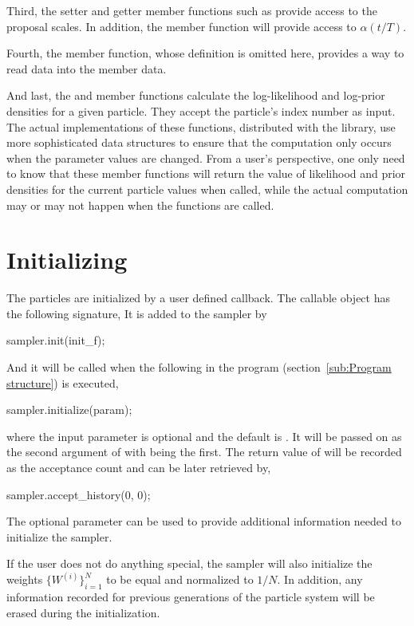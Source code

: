 Third, the setter and getter member functions such as 
provide access to the proposal scales. In addition, the member function
 will provide access to $\alpha(t/T)$.

Fourth, the  member function, whose definition is omitted
here, provides a way to read data into the  member data.

And last, the  and  member
functions calculate the log-likelihood and log-prior densities for a given
particle. They accept the particle's index number as input. The actual
implementations of these functions, distributed with the library, use more
sophisticated data structures to ensure that the computation only occurs when
the parameter values are changed. From a user's perspective, one only need to
know that these member functions will return the value of likelihood and prior
densities for the current particle values when called, while the actual
computation may or may not happen when the functions are called.

\section{Initializing}
\label{sec:Initializing}

The particles are initialized by a user defined callback. The callable object
has the following signature,
It is added to the sampler by
\begin{cppcode}
sampler.init(init_f);
\end{cppcode}
And it will be called when the following in the program
(section~\ref{sub:Program structure}) is executed,
\begin{cppcode}
sampler.initialize(param);
\end{cppcode}
where the input parameter  is optional and the default is
. It will be passed on as the second argument of
 with  being the first. The
return value of  will be recorded as the acceptance count
and can be later retrieved by,
\begin{cppcode}
sampler.accept_history(0, 0);
\end{cppcode}
The optional parameter can be used to provide additional information needed to
initialize the sampler.

If the user does not do anything special, the sampler will also initialize the
weights $\{W^{(i)}\}_{i=1}^N$ to be equal and normalized to $1/N$. In
addition, any information recorded for previous generations of the particle
system will be erased during the initialization.

